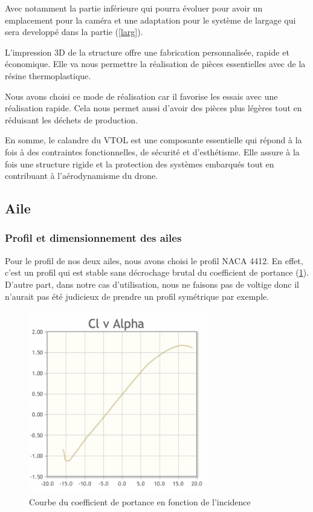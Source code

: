 \documentclass[a4paper,12pt,french]{report}
\begin{document}
Avec notamment la partie inférieure qui pourra évoluer pour avoir un emplacement pour la caméra et une adaptation pour le système de largage qui sera developpé dans la partie (\ref{larg}).\newline

L'impression 3D de la structure offre une fabrication personnalisée, rapide et économique. Elle va nous permettre la réalisation de pièces essentielles avec de la résine thermoplastique.

Nous avons choisi ce mode de réalisation car il favorise les essais avec une réalisation rapide. Cela nous permet aussi d’avoir des pièces plus légères tout en réduisant les déchets de production.\newline

En somme, le calandre du VTOL est une composante essentielle qui répond à la fois à des contraintes fonctionnelles, de sécurité et d'esthétisme. Elle assure à la fois une structure rigide et la protection des systèmes embarqués tout en contribuant à l'aérodynamisme du drone.


\subsection{Aile}

\subsubsection*{Profil et dimensionnement des ailes}

Pour le profil de nos deux ailes, nous avons choisi le profil NACA 4412. En effet, c'est un profil qui est stable sans décrochage brutal du coefficient de portance (\ref{cz}). D'autre part, dans notre cas d'utilisation, nous ne faisons pas de voltige donc il n'aurait pas été judicieux de prendre un profil symétrique par exemple.\newline

\begin{figure}[h]
    \centering
    \includegraphics[height=8cm]{figures/cz.png}
    \caption{Courbe du coefficient de portance en fonction de l'incidence}
    \label{cz}
\end{figure}
\end{document}
